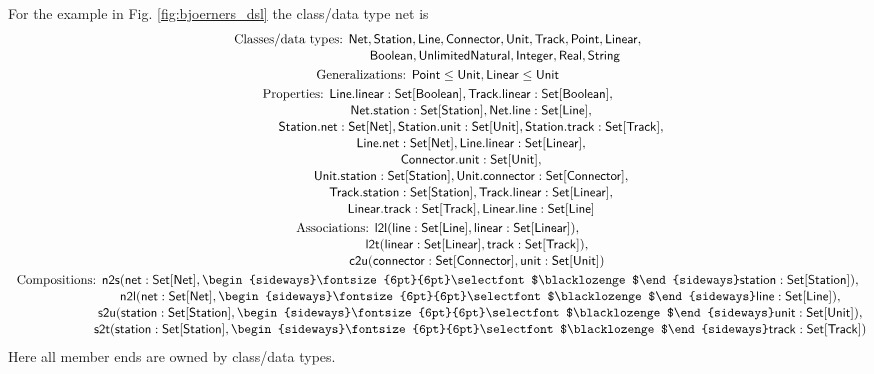 \documentclass[10pt,fleqn,final]{scrreprt}
\newcommand{\cbs}[0]{\color{red}\xspace} %
\newcommand{\cbe}[0]{\color{black}\xspace} %
\newenvironment{definitions}[0]{\medskip }{}
\newcommand{\composition}{\raisebox{0.2pt}{\begin{sideways}\fontsize{6pt}{6pt}\selectfont$\blacklozenge$\end{sideways}}}
\begin{document}
\begin{definitions}
\medskip
\cbs For the example in Fig. \ref{fig:bjoerners_dsl} the class/data type net is\cbe 
%
\begin{gather*}
  \text{Classes/data types: }\mathsf{Net}, \mathsf{Station}, \mathsf{Line}, \mathsf{Connector}, \mathsf{Unit}, \mathsf{Track}, \mathsf{Point}, \mathsf{Linear},
\\[-.5ex]
  \phantom{\text{Classes/data types: }}\mathsf{Boolean}, \mathsf{UnlimitedNatural}, \mathsf{Integer}, \mathsf{Real}, \mathsf{String}
\\
  \text{Generalizations: }\mathsf{Point} \leq \mathsf{Unit}, \mathsf{Linear} \leq \mathsf{Unit}
\\
  \text{Properties: }\mathsf{Line.linear : Set[Boolean]}, \mathsf{Track.linear : Set[Boolean]},
\\[-.5ex]
  \phantom{\text{Properties: }}\mathsf{Net.station : Set[Station]}, \mathsf{Net.line : Set[Line]},
\\[-.5ex]
  \phantom{\text{Properties: }}\mathsf{Station.net : Set[Net]}, \mathsf{Station.unit : Set[Unit]}, \mathsf{Station.track : Set[Track]},
\\[-.5ex]
  \phantom{\text{Properties: }}\mathsf{Line.net : Set[Net]}, \mathsf{Line.linear : Set[Linear]},
\\[-.5ex]
  \phantom{\text{Properties: }}\mathsf{Connector.unit : Set[Unit]},
\\[-.5ex]
  \phantom{\text{Properties: }}\mathsf{Unit.station : Set[Station]}, \mathsf{Unit.connector : Set[Connector]},
\\[-.5ex]
  \phantom{\text{Properties: }}\mathsf{Track.station : Set[Station]}, \mathsf{Track.linear : Set[Linear]},
\\[-.5ex]
  \phantom{\text{Properties: }}\mathsf{Linear.track : Set[Track]}, \mathsf{Linear.line : Set[Line]}
\\
  \text{Associations: }\mathsf{l2l(line : Set[Line], linear : Set[Linear])},
\\[-.5ex]
  \phantom{\text{Associations: }}\mathsf{l2t(linear : Set[Linear], track : Set[Track])},
\\[-.5ex]
  \phantom{\text{Associations: }}\mathsf{c2u(connector : Set[Connector], unit : Set[Unit])}
\\
  \text{Compositions: }\mathsf{n2s(net : Set[Net], \composition station : Set[Station])},
\\[-.5ex]
  \phantom{\text{Compositions: }}\mathsf{n2l(net : Set[Net], \composition line : Set[Line])},
\\[-.5ex]
  \phantom{\text{Compositions: }}\mathsf{s2u(station : Set[Station], \composition unit : Set[Unit])},
\\[-.5ex]
  \phantom{\text{Compositions: }}\mathsf{s2t(station : Set[Station], \composition track : Set[Track])}
\end{gather*}
%
Here all member ends are owned by class/data types.



\end{definitions}
\end{document}
